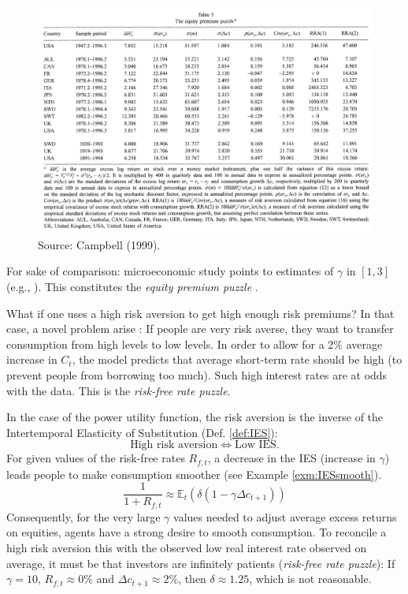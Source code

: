 \documentclass[
  12pt,
]{book}
\theoremstyle{definition}
\theoremstyle{definition}
\theoremstyle{definition}
\theoremstyle{definition}
\theoremstyle{remark}
\begin{document}
\begin{figure}

{\centering \includegraphics[width=1\linewidth]{figures/table_campbell1999_eqpuzzle} 

}

\caption{Source: Campbell (1999).}\label{fig:Campbell1}
\end{figure}

For sake of comparison: microeconomic study points to estimates of \(\gamma\) in \([1,3]\) (e.g., \citet{Hartley_Lanot_Walker_2014}). This constitutes the \emph{equity premium puzzle} \citep{Mehra_Prescott_1985}.

What if one uses a high risk aversion to get high enough risk premiums? In that case, a novel problem arise \citep{Kandel_Stambaugh_1991}: If people are very risk averse, they want to transfer consumption from high levels to low levels.
In order to allow for a 2\% average increase in \(C_t\), the model predicts that average short-term rate should be high (to prevent people from borrowing too much). Such high interest rates are at odds with the data. This is the \emph{risk-free rate puzzle}.

In the case of the power utility function, the risk aversion is the inverse of the Intertemporal Elasticity of Substitution (Def. \ref{def:IES}):
\[
\mbox{High risk aversion} \Leftrightarrow \mbox{Low IES}.
\]
For given values of the risk-free rates \(R_{f,t}\), a decrease in the IES (increase in \(\gamma\)) leads people to make consumption smoother (see Example \ref{exm:IESsmooth}).
\[
\frac{1}{1+R_{f,t}} \approx \mathbb{E}_t(\delta (1 - \gamma \Delta c_{t+1}))
\]
Consequently, for the very large \(\gamma\) values needed to adjust average excess returns on equities, agents have a strong desire to smooth consumption. To reconcile a high risk aversion this with the observed low real interest rate observed on average, it must be that investors are infinitely patients (\emph{risk-free rate puzzle}):
If \(\gamma=10\), \(R_{f,t} \approx 0\%\) and \(\Delta c_{t+1} \approx 2\%\), then \(\delta \approx 1.25\), which is not reasonable.
\end{document}
